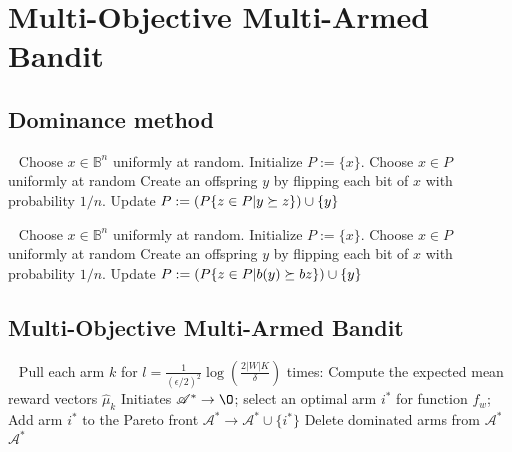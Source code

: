 \section*{Multi-Objective Multi-Armed Bandit}
\subsection*{Dominance method}
\begin{algo}
\label{algo:GSEMO}
\begin{algorithmic}
\STATE	$\ \ $
\STATE	Choose $x\in \mathbb{B}^n$ uniformly at random.
\STATE	Initialize $P:=\{x\}$.
\REPEAT	
	\STATE	Choose $x\in P$ uniformly at random
    \STATE	Create an offspring $y$ by flipping each bit of $x$ with probability $1/n$.
    	\STATE	Update $P:= (P\/\{z\in P|y\succeq z\}) \cup \{y\}$ 
    \ENDIF
{}
\end{algorithmic}
\end{algo}

\begin{algo}
\label{algo:GDEMO}
\begin{algorithmic}
\STATE	$\ \ $
\STATE	Choose $x\in \mathbb{B}^n$ uniformly at random.
\STATE	Initialize $P:=\{x\}$.
\REPEAT	
	\STATE	Choose $x\in P$ uniformly at random
    \STATE	Create an offspring $y$ by flipping each bit of $x$ with probability $1/n$.
    	\STATE	Update $P:= (P\/\{z\in P| b(y)\succeq b{z}\}) \cup \{y\}$ 
    \ENDIF
{}
\end{algorithmic}
\end{algo}

\subsection*{Multi-Objective Multi-Armed Bandit}


\begin{algo}
\label{algo:spac}
\begin{algorithmic}
\STATE	$\ \ $
\STATE	Pull each arm $k$ for $l=\frac{1}{(\epsilon/2)^2}\log{(\frac{2|W|K}{\delta})}$ times:
\STATE	Compute the expected mean reward vectors $\hat{\mu}_k$
\ENDFOR
\STATE	Initiates $\mathscr{A}^{\ast} \rightarrow \O$;
\STATE	select an optimal arm $i^{\ast}$ for function $f_w$;
\STATE	Add arm $i^{\ast}$ to the Pareto front $\mathscr{A^{\ast}}\rightarrow \mathscr{A}^{\ast} \cup \{i^{\ast}\}$
\STATE	Delete dominated arms from $\mathscr{A}^{\ast}$
\ENDFOR
\RETURN	$\mathscr{A}^{\ast}$
\end{algorithmic}
\end{algo}

